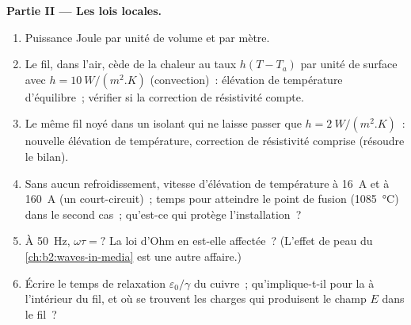 \begin{problem}
\medskip
\noindent\textbf{Partie II --- Les lois locales.}
\begin{enumerate}[resume]
  \item Puissance Joule par unité de volume et par mètre.
  \item Le fil, dans l'air, cède de la chaleur au taux $h(T - T_a)$ par unité de
        surface avec $h = \qty{10}{W/(m^2.K)}$ (convection)~: élévation de
        température d'équilibre~; vérifier si la correction de résistivité
        compte.
  \item Le même fil noyé dans un isolant qui ne laisse passer que $h =
        \qty{2}{W/(m^2.K)}$~: nouvelle élévation de température, correction de
        résistivité comprise (résoudre le bilan).
  \item Sans aucun refroidissement, vitesse d'élévation de température à \qty{16}{A}
        et à \qty{160}{A} (un court-circuit)~; temps pour atteindre le point de
        fusion (\qty{1085}{\degreeCelsius}) dans le second cas~; qu'est-ce qui protège
        l'installation~?
  \item À \qty{50}{Hz}, $\omega\tau = ?$ La loi d'Ohm en est-elle affectée~? (L'effet
        de peau du \cref{ch:b2:waves-in-media} est une autre affaire.)
  \item Écrire le temps de relaxation $\varepsilon_0/\gamma$ du cuivre~; qu'implique-t-il
        pour la  à l'intérieur du fil, et où se trouvent
        les charges qui produisent le champ $E$ dans le fil~?
\end{enumerate}


\end{problem}
